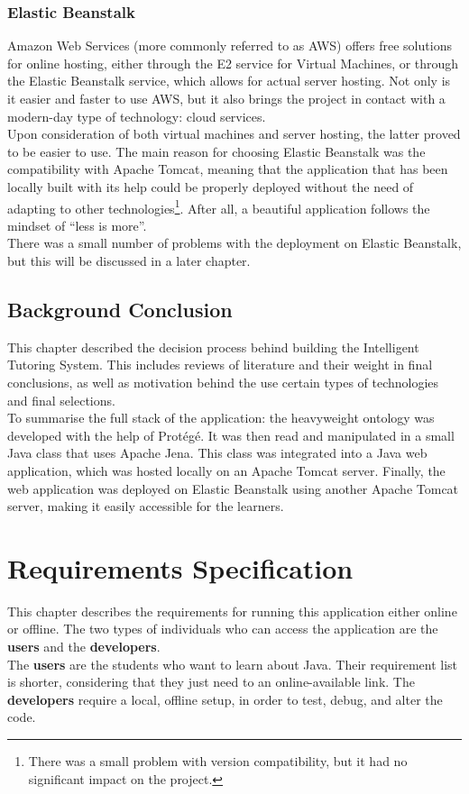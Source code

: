 \documentclass[12pt]{report}
\begin{document}
	\subsection{Elastic Beanstalk}
	Amazon Web Services (more commonly referred to as AWS) offers free solutions for online hosting, either through the E2 service for Virtual Machines, or through the Elastic Beanstalk service, which allows for actual server hosting. Not only is it easier and faster to use AWS, but it also brings the project in contact with a modern-day type of technology: cloud services.\\
	Upon consideration of both virtual machines and server hosting, the latter proved to be easier to use. The main reason for choosing Elastic Beanstalk was the compatibility with Apache Tomcat, meaning that the application that has been locally built with its help could be properly deployed without the need of adapting to other technologies\footnote{There was a small problem with version compatibility, but it had no significant impact on the project.}. After all, a beautiful application follows the mindset of ``less is more''.\\
	There was a small number of problems with the deployment on Elastic Beanstalk, but this will be discussed in a later chapter.
	
	\section{Background Conclusion}
	This chapter described the decision process behind building the Intelligent Tutoring System. This includes reviews of literature and their weight in final conclusions, as well as motivation behind the use certain types of technologies and final selections.\\
	To summarise the full stack of the application: the heavyweight ontology was developed with the help of Protégé. It was then read and manipulated in a small Java class that uses Apache Jena. This class was integrated into a Java web application, which was hosted locally on an Apache Tomcat server. Finally, the web application was deployed on Elastic Beanstalk using another Apache Tomcat server, making it easily accessible for the learners.
	
	
	\chapter{Requirements Specification}
	This chapter describes the requirements for running this application either online or offline. The two types of individuals who can access the application are the \textbf{users} and the \textbf{developers}.\\
	The \textbf{users} are the students who want to learn about Java. Their requirement list is shorter, considering that they just need to an online-available link. The \textbf{developers} require a local, offline setup, in order to test, debug, and alter the code.
	
\end{document}

